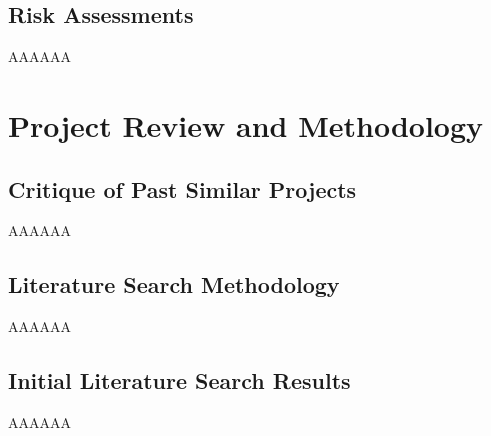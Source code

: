 \documentclass[12pt]{report}
\begin{document}
    \section{Risk Assessments}
    AAAAAA

    \chapter{Project Review and Methodology}
    \section{Critique of Past Similar Projects}
    AAAAAA
    \section{Literature Search Methodology}
    AAAAAA
    \section{Initial Literature Search Results}
    AAAAAA

    \printbibliography
\end{document}
